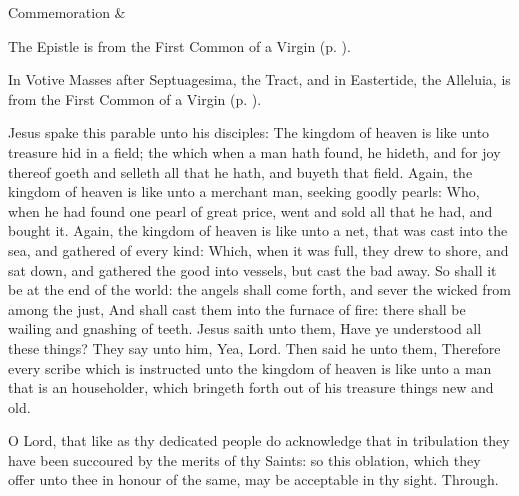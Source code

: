 \begin{rubric}
	Commemoration  \& 
\end{rubric}

\begin{rubric}
	The Epistle is from the First Common of a Virgin (p. \pageref{CommonVirginOnlyIEpistle}).
\end{rubric}


\begin{rubric}
	In Votive Masses after Septuagesima, the Tract, and in Eastertide, the Alleluia, is from the First Common of a Virgin (p. \pageref{CommonVirginOnlyI}).
\end{rubric}

 Jesus spake this parable unto his disciples: The kingdom of heaven is like unto treasure hid in a field; the which when a man hath found, he hideth, and for joy thereof goeth and selleth all that he hath, and buyeth that field. Again, the kingdom of heaven is like unto a merchant man, seeking goodly pearls: Who, when he had found one pearl of great price, went and sold all that he had, and bought it. Again, the kingdom of heaven is like unto a net, that was cast into the sea, and gathered of every kind: Which, when it was full, they drew to shore, and sat down, and gathered the good into vessels, but cast the bad away. So shall it be at the end of the world: the angels shall come forth, and sever the wicked from among the just, And shall cast them into the furnace of fire: there shall be wailing and gnashing of teeth. Jesus saith unto them, Have ye understood all these things? They say unto him, Yea, Lord. Then said he unto them, Therefore every scribe which is instructed unto the kingdom of heaven is like unto a man that is an householder, which bringeth forth out of his treasure things new and old.


\secret
{} O Lord, that like as thy dedicated people do acknowledge that in tribulation they have been succoured by the merits of thy Saints: so this oblation, which they offer unto thee in honour of the same, may be acceptable in thy sight. Through.

